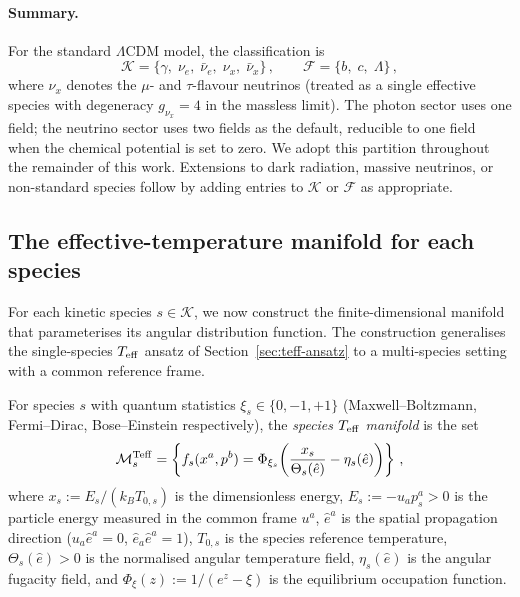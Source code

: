 \paragraph{Summary.}

For the standard $\Lambda$CDM model, the classification is
\begin{equation}\label{eq:species-partition}
\mathcal{K} = \{\gamma,\; \nu_e,\;
  \bar{\nu}_e,\; \nu_x,\; \bar{\nu}_x\}\,,
\qquad
\mathcal{F} = \{b,\; c,\; \Lambda\}\,,
\end{equation}
where $\nu_x$ denotes the $\mu$- and $\tau$-flavour
neutrinos (treated as a single effective species with
degeneracy $g_{\nu_x} = 4$ in the massless limit).  The
photon sector uses one field; the neutrino sector uses two
fields as the default, reducible to one field when the
chemical potential is set to zero.  We adopt this partition
throughout the remainder of this work.  Extensions
to dark radiation, massive neutrinos, or non-standard
species follow by adding entries to $\mathcal{K}$ or
$\mathcal{F}$ as appropriate.


\subsection{The effective-temperature manifold for each species}
\label{sec:species-teff}

For each kinetic species $s \in \mathcal{K}$, we now
construct the finite-dimensional manifold that
parameterises its angular distribution function.  The
construction generalises the single-species $T_{\mathrm{eff}}$ ansatz
of Section~\ref{sec:teff-ansatz} to a multi-species
setting with a common reference frame.

\begin{definition}
\label{def:species-Teff}
For species $s$ with quantum statistics
$\xi_s \in \{0, -1, +1\}$ (Maxwell--Boltzmann,
Fermi--Dirac, Bose--Einstein respectively), the
\emph{species $T_{\mathrm{eff}}$ manifold} is the set
\begin{equation}\label{eq:Teff-manifold}
\mathcal{M}_s^{\rm Teff}
= \left\{
f_s(x^a, p^b)
= \Phi_{\xi_s}\!\left(
  \frac{x_s}{\Theta_s(\hat{e})}
  - \eta_s(\hat{e})
\right)
\right\}\,,
\end{equation}
where $x_s := E_s / (k_B T_{0,s})$ is the dimensionless
energy, $E_s := -u_a p_s^a > 0$ is the particle energy
measured in the common frame $u^a$,
$\hat{e}^a$ is the spatial propagation direction
($u_a \hat{e}^a = 0$, $\hat{e}_a \hat{e}^a = 1$),
$T_{0,s}$ is the species reference temperature,
$\Theta_s(\hat{e}) > 0$ is the normalised angular
temperature field, $\eta_s(\hat{e})$ is the angular
fugacity field, and $\Phi_\xi(z) := 1/(e^z - \xi)$ is
the equilibrium occupation function.
\end{definition}

